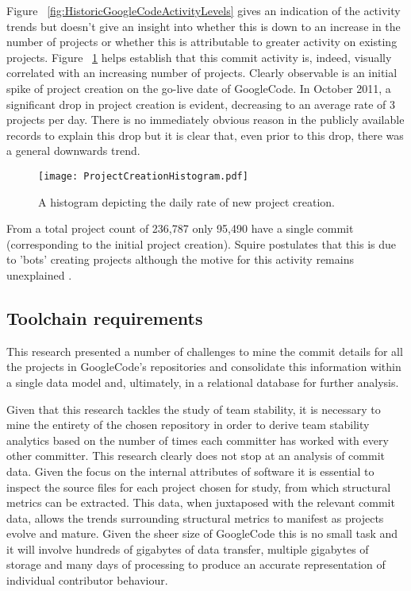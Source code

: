 Figure ~\ref{fig:HistoricGoogleCodeActivityLevels} gives an indication of the activity trends but doesn't give an insight into whether this is down to an increase in the number of projects or whether this is attributable to greater activity on existing projects. Figure ~\ref{fig:ProjectCreationHistogram} helps establish that this commit activity is, indeed, visually correlated with an increasing number of projects. Clearly observable is an initial spike of project creation on the go-live date of GoogleCode. In October 2011, a significant drop in project creation is evident, decreasing to an average rate of 3 projects per day. There is no immediately obvious reason in the publicly available records to explain this drop but it is clear that, even prior to this drop, there was a general downwards trend.

\begin{figure}[htbp!] 
\centering    
\texttt{[image: ProjectCreationHistogram.pdf]}
\caption{A histogram depicting the daily rate of new project creation.}
\label{fig:ProjectCreationHistogram}
\end{figure}
	
From a total project count of 236,787 only 95,490 have a single commit (corresponding to the initial project creation). Squire postulates that this is due to 'bots' creating projects although the motive for this activity remains unexplained \citep{squire2017lives}.

\subsection{Toolchain requirements}
This research presented a number of challenges to mine the commit details for all the projects in GoogleCode's repositories and consolidate this information within a single data model and, ultimately, in a relational database for further analysis. 

Given that this research tackles the study of team stability, it is necessary to mine the entirety of the chosen repository in order to derive team stability analytics based on the number of times each committer has worked with every other committer. This research clearly does not stop at an analysis of commit data. Given the focus on the internal attributes of software it is essential to inspect the source files for each project chosen for study, from which structural metrics can be extracted. This data, when juxtaposed with the relevant commit data, allows the trends surrounding structural metrics to manifest as projects evolve and mature. Given the sheer size of GoogleCode this is no small task and it will involve hundreds of gigabytes of data transfer, multiple gigabytes of storage and many days of processing to produce an accurate representation of individual contributor behaviour.

